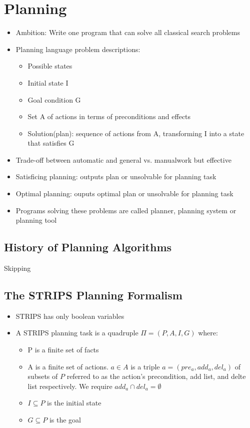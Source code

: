 \documentclass{scrartcl}
\begin{document}
\section{Planning}
\begin{itemize}
    \item
        Ambition: Write one program that can solve all classical search problems
    \item
        Planning language problem descriptions: 
        \begin{itemize}
            \item
                Possible states
            \item
                Initial state I
            \item
                Goal condition G
            \item
                Set A of actions in terms of preconditions and effects
            \item
                Solution(plan): sequence of actions from A, transforming I into a state that satisfies G
        \end{itemize}
    \item
        Trade-off between automatic and general vs. manualwork but effective
    \item
        Satisficing planning: outputs plan or unsolvable for planning task
    \item
        Optimal planning: ouputs optimal plan or unsolvable for planning task
    \item
        Programs solving these problems are called planner, planning system or planning tool
\end{itemize}
\subsection{History of Planning Algorithms}
Skipping
\subsection{The STRIPS Planning Formalism}
\begin{itemize}
    \item
        STRIPS has only boolean variables
    \item
        A STRIPS planning task is a quadruple $\Pi = (P, A, I, G)$ where:
        \begin{itemize}
            \item
                P is a finite set of facts
            \item
                A is a finite set of actions. $a \in A$ is a triple $a=(pre_a, add_a, del_a)$ of subsets of $P$ referred to as the action's precondition, add list, and delte list respectively. We require $add_a \cap del_a = \emptyset$
            \item
                $I \subseteq P$ is the initial state
            \item
                $G \subseteq P$ is the goal
        \end{itemize}
\end{itemize}
\end{document}
